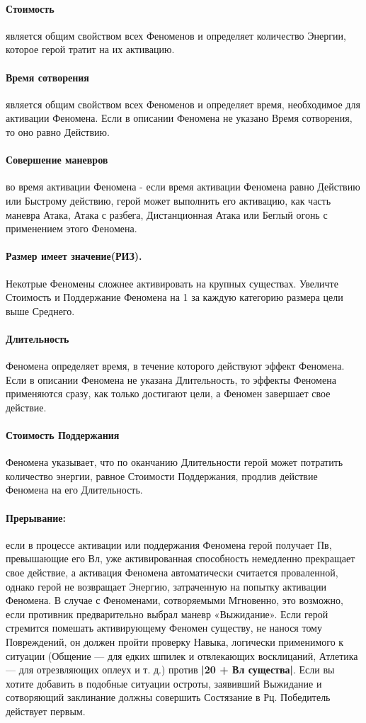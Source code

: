 \paragraph{Стоимость} является общим свойством всех Феноменов и определяет количество Энергии, которое герой тратит на их активацию.
\paragraph{Время сотворения} является общим свойством всех Феноменов и определяет время, необходимое для активации Феномена. Если в описании Феномена не указано Время сотворения, то оно равно Действию.
\paragraph{Совершение маневров} во время активации Феномена - если время активации Феномена равно Действию или Быстрому действию, герой может выполнить его активацию, как часть маневра Атака, Атака с разбега, Дистанционная Атака или Беглый огонь с применением этого Феномена.
\paragraph{Размер имеет значение(РИЗ).} Некотрые Феномены сложнее активировать на крупных существах. Увеличте Стоимость и Поддержание Феномена на 1 за каждую категорию размера цели выше Среднего.
\paragraph{Длительность} Феномена определяет время, в течение которого действуют эффект Феномена. Если в описании Феномена не указана Длительность, то эффекты Феномена применяются сразу, как только достигают цели, а Феномен завершает свое действие.
\paragraph{Стоимость Поддержания} Феномена указывает, что по оканчанию Длительности герой может потратить количество энергии, равное Стоимости Поддержания, продлив действие Феномена на его Длительность.
\paragraph{Прерывание:} если в процессе активации или поддержания Феномена герой получает Пв, превышающие его Вл, уже активированная способность немедленно прекращает свое действие, а активация Феномена автоматически считается проваленной, однако герой не возвращает Энергию, затраченную на попытку активации Феномена. В случае с Феноменами, сотворяемыми Мгновенно, это возможно, если противник предварительно выбрал маневр «Выжидание».
\newline
Если герой стремится помешать активирующему Феномен существу, не нанося тому Повреждений, он должен пройти проверку Навыка, логически применимого к ситуации (Общение — для едких шпилек и отвлекающих восклицаний, Атлетика — для отрезвляющих оплеух и т. д.) против \textbf{|20 + Вл существа|}.
\newline
Если вы хотите добавить в подобные ситуации остроты, заявивший Выжидание и сотворяющий заклинание должны совершить Состязание в Рц. Победитель действует первым.
